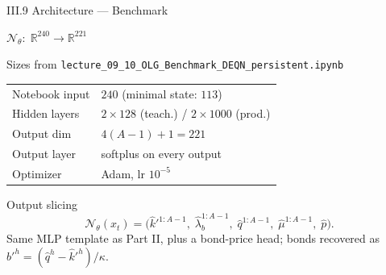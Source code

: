 \documentclass[aspectratio=169,11pt]{beamer}
\newcommand{\R}{\mathbb{R}}
\newcommand{\N}{\mathcal{N}}
\begin{document}
\begin{frame}{III.9 Architecture --- Benchmark}
\scriptsize
\begin{center}
$\N_\theta:\;\R^{240} \to \R^{221}$
\end{center}
\vspace{-4pt}

\begin{block}{Sizes from \texttt{lecture\_09\_10\_OLG\_Benchmark\_DEQN\_persistent.ipynb}}
\centering
\begin{tabular}{ll}
\toprule
Notebook input   & $240$ (minimal state: $113$) \\
Hidden layers    & $2{\times}128$ (teach.) / $2{\times}1000$ (prod.) \\
Output dim       & $4(A{-}1) + 1 = 221$ \\
Output layer     & softplus on every output \\
Optimizer        & Adam, lr $10^{-5}$\\
\bottomrule
\end{tabular}
\end{block}

\vspace{-3pt}
\begin{exampleblock}{Output slicing}
\vspace{-6pt}
\[
\N_\theta(x_t)
=
\bigl(\hat k'^{1:A-1},\;\hat\lambda_b^{1:A-1},\;\hat q^{1:A-1},\;\hat\mu^{1:A-1},\;\hat p\bigr).
\]
\vspace{-4pt}
Same MLP template as Part II, plus a bond-price head; bonds recovered as $\hat b'^h=(\hat q^h-\hat k'^h)/\kappa$.
\end{exampleblock}
\end{frame}
\end{document}
